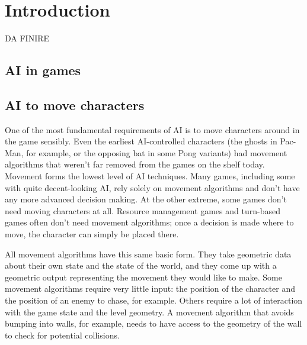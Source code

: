 \chapter{Introduction}
\begin{huge}
DA FINIRE
\end{huge}
\section{AI in games}

\section{AI to move characters}
One of the most fundamental requirements of AI is to move characters around in the game sensibly. Even the earliest AI-controlled characters (the ghosts in Pac-Man, for example, or the opposing bat in some Pong variants) had movement algorithms that weren’t far removed from the games on the shelf today. Movement forms the lowest level of AI techniques. Many games, including some with quite decent-looking AI, rely solely on movement algorithms and don’t have any more advanced decision making. At the other extreme, some games don’t need moving characters at all. Resource management games and turn-based games often don’t need movement algorithms; once a decision is made where to move, the character can simply be placed there.

All movement algorithms have this same basic form. They take geometric data about their
own state and the state of the world, and they come up with a geometric output representing the movement they would like to make.
Some movement algorithms require very little input: the position of the character and the
position of an enemy to chase, for example. Others require a lot of interaction with the game
state and the level geometry. A movement algorithm that avoids bumping into walls, for example, needs to have access to the geometry of the wall to check for potential collisions.

